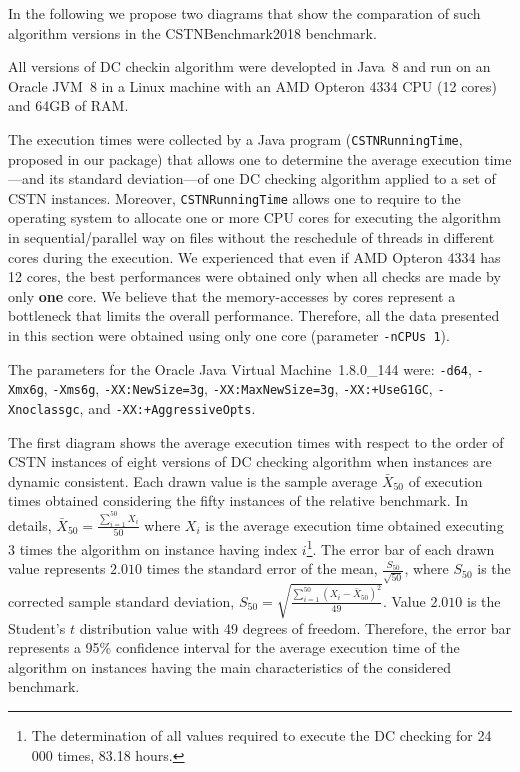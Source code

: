 \documentclass[a4paper,11pt]{article}
\begin{document}
In the following we propose two diagrams that show the comparation of such algorithm versions in the CSTNBenchmark2018 benchmark.

All versions of DC checkin algorithm were developted in Java~8 and run on an Oracle JVM~8 in a Linux machine with an AMD Opteron 4334
CPU (12 cores) and 64GB of RAM.

The execution times were collected by a Java program (\texttt{CSTNRunningTime}, proposed in our package) that allows one to determine the average execution time---and its standard deviation---of one DC checking algorithm applied to a set of CSTN instances. Moreover,  \texttt{CSTNRunningTime} allows one to require to the operating system to allocate one or more
CPU cores for executing the algorithm in sequential/parallel way on files without the reschedule of threads in different cores during the execution.
We experienced that even if AMD Opteron 4334 has 12 cores, the best performances were obtained only when all checks are made by only \textbf{one} core.
We believe that the memory-accesses by cores represent a bottleneck that limits the overall performance.
Therefore, all the data presented in this section were obtained using only one core (parameter \texttt{-nCPUs 1}).

The parameters for the Oracle Java Virtual Machine~1.8.0\_144 were: \texttt{-d64}, \texttt{-Xmx6g}, \texttt{-Xms6g}, \texttt{-XX:NewSize=3g}, \texttt{-XX:MaxNewSize=3g}, \texttt{-XX:+UseG1GC}, \texttt{-Xnoclassgc}, and \texttt{-XX:+AggressiveOpts}.
 
The first diagram shows the average execution times with respect to the order of CSTN instances of eight versions of DC checking algorithm when instances are dynamic consistent. 
Each drawn value is the sample average $\bar{X}_{50}$ of execution times obtained considering the fifty instances of the relative benchmark. 
In details, $\bar{X}_{50}=\frac{\sum_{i=1}^{50} X_i}{50}$ where $X_i$ is the average execution time obtained executing 3 times the algorithm on instance having index $i$\footnote{The determination of all values required to execute the DC checking for 24 000 times, 83.18 hours.}.
The error bar of each drawn value represents $2.010$ times the standard error of the mean, $\frac{S_{50}}{\sqrt{50}}$, where $S_{50}$ is the corrected sample standard deviation, $S_{50}= \sqrt{\frac{\sum_{i=1}^{50} (X_i-\bar{X}_{50})^2}{49}}$. Value $2.010$ is the Student's $t$ distribution value with 49 degrees of freedom. 
Therefore, the error bar represents a 95\% confidence interval for the average execution time of the algorithm on instances having the main characteristics of the considered benchmark.
\end{document}
